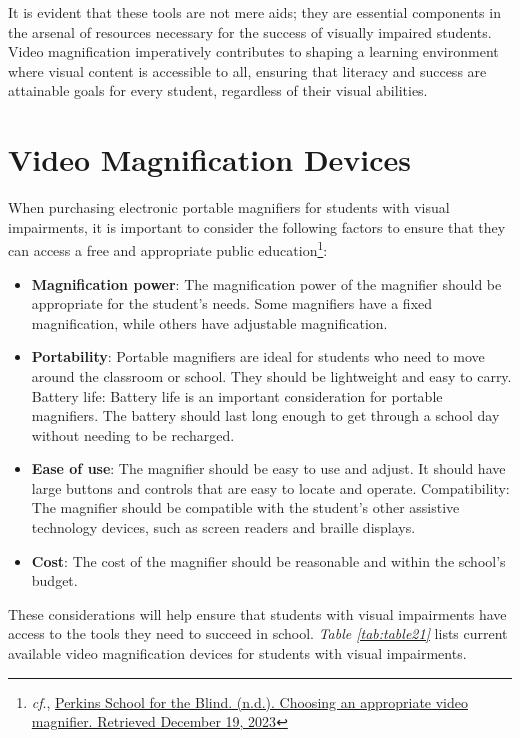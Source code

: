 It is evident that these tools are not mere aids; they are essential components in the arsenal of resources necessary for the success of visually impaired students. Video magnification imperatively contributes to shaping a learning environment where visual content is accessible to all, ensuring that literacy and success are attainable goals for every student, regardless of their visual abilities.


\pagebreak\hypertarget{video-magnification-devices}{}\section{Video Magnification
 Devices}\label{video-magnification-devices}
When purchasing electronic portable magnifiers for students with visual impairments, it is important to consider the following factors to ensure that they can access a free and appropriate public education\footnote{\raggedright \textit{cf}., \href{http://www.perkins.org/resource/choosing-appropriate-video-magnifier/}{Perkins School for the Blind. (n.d.). Choosing an appropriate video magnifier. Retrieved December 19, 2023}}:
\begin{itemize}[leftmargin=*]
 \item \textbf{Magnification power}: The magnification power of the magnifier should be appropriate for the student’s needs. Some magnifiers have a fixed magnification, while others have adjustable magnification.
 \item \textbf{Portability}: Portable magnifiers are ideal for students who need to move around the classroom or school. They should be lightweight and easy to carry.
 Battery life: Battery life is an important consideration for portable magnifiers. The battery should last long enough to get through a school day without needing to be recharged.
 \item \textbf{Ease of use}: The magnifier should be easy to use and adjust. It should have large buttons and controls that are easy to locate and operate.
 Compatibility: The magnifier should be compatible with the student’s other assistive technology devices, such as screen readers and braille displays.
 \item \textbf{Cost}: The cost of the magnifier should be reasonable and within the school’s budget.
\end{itemize}
These considerations will help ensure that students with visual impairments have access to the tools they need to succeed in school. \textit{Table \ref{tab:table21}} lists current available video magnification devices for students with visual impairments.

